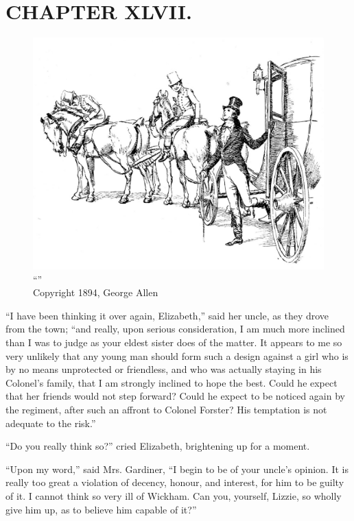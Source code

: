 \chapter{CHAPTER XLVII.}

\begin{figure}[htbp]
    \centering
    \includegraphics[width=\textwidth]{illustrations/i_031.jpg}
    \caption{“”\\ Copyright 1894, George Allen}
    \label{fig:image}
\end{figure}


``I have been thinking it over again, Elizabeth,'' said her uncle, as they drove from the town; ``and really, upon serious consideration, I am much more inclined than I was to judge as your eldest sister does of the matter. It appears to me so very unlikely that any young man should form such a design against a girl who is by no means unprotected or friendless, and who was actually staying in his Colonel's family, that I am strongly inclined to hope the best. Could he expect that her friends would not step forward? Could he expect to be noticed again by the regiment, after such an affront to Colonel Forster? His temptation is not adequate to the risk.''

``Do you really think so?'' cried Elizabeth, brightening up for a moment.

``Upon my word,'' said Mrs. Gardiner, ``I begin to be of your uncle's opinion. It is really too great a violation of decency, honour, and interest, for him to be guilty of it. I cannot think so very ill of Wickham. Can you, yourself, Lizzie, so wholly give him up, as to believe him capable of it?''

